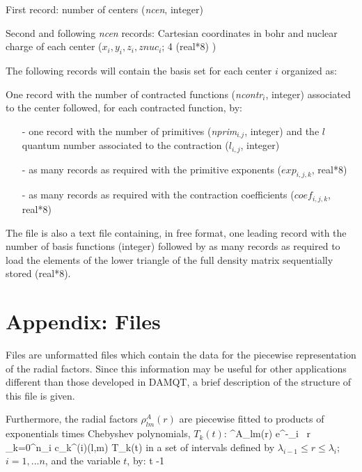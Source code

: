 \documentclass[10pt]{article}
\begin{document}
First record: number of centers ({\it ncen}, integer)

Second and following {\it ncen} records: Cartesian coordinates in bohr and
nuclear charge of each center ($x_i, y_i,z_i, znuc_i$; 4 (real*8) )

The following records will contain the basis set for each center $i$
organized as: 

One record with the number of contracted functions ({\it ncontr$_i$}, integer)
associated to the center followed, for each contracted function, by:
\begin{itemize}
\item[-] one record with the number of primitives ({\it nprim$_{i.j}$},
integer)
and the $l$ quantum number associated to the contraction ({$l_{i,j}$},
integer)
\item[-] as many records as required with the primitive exponents
($exp_{i,j,k}$, real*8)
\item[-] as many records as required with the contraction coefficients
($coef_{i,j,k}$, real*8)
\end{itemize}

The \den{ } file is also a text file containing,
in free format, one leading record with the
number of basis functions (integer) followed by as many records as required to
load the elements of the lower triangle of the full density matrix
sequentially
stored (real*8).

\section{Appendix: Files \damqt\label{A2}}

Files \damqt{} are unformatted files
which contain the data for the
piecewise representation of the radial factors. Since this information may be
useful for other applications different than those developed in DAMQT, a brief
description of the structure of this file is given.

Furthermore, the radial factors $\rho^A_{lm}(r)$ are piecewise fitted
to products of exponentials times Chebyshev polynomials, $T_k(t)$:
%
\be \label{eq:A2.1}
\rho^A_{lm}(r) \simeq e^{-\xi_i \, r} \; \sum_{k=0}^{n_i} c_k^{(i)}(l,m) \;
T_k(t)
\ee
%
in a set of intervals defined by $\lambda_{i-1} \le r \le \lambda_i$;  $i = 1, ...
n$, and the variable $t$, by:
%
\be   \label{eq:A2.2}
t  \; -1
\ee
%
\end{document}
